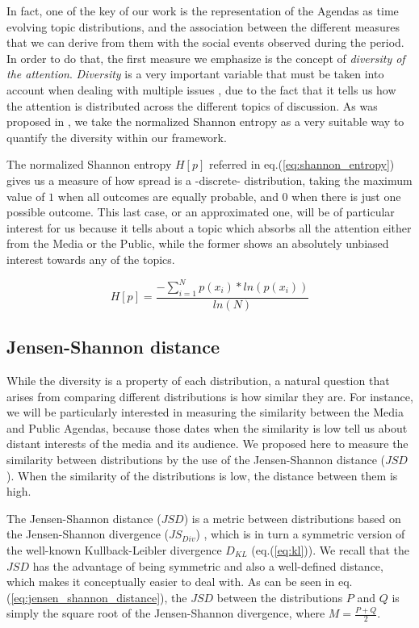 \documentclass{bmcart}
\begin{document}
\par In fact, one of the key of our work is the representation of the Agendas as time evolving topic distributions, and the association between the different measures that we can derive from them with the social events observed during the period.
In order to do that, the first measure we emphasize is the concept of \emph{diversity of the attention}.
\emph{Diversity} is a very important variable that must be taken into account when dealing with multiple issues \cite{boydstun2014importance}, due to the fact that it tells us how the attention is distributed across the different topics of discussion. 
As was proposed in \cite{boydstun2014importance}, we take the normalized Shannon entropy as a very suitable way to quantify the diversity within our framework.
\par The normalized Shannon entropy $H[p]$ referred in eq.(\ref{eq:shannon_entropy}) gives us a measure of how spread is a -discrete- distribution, taking the maximum value of $1$ when all outcomes are equally probable, and $0$ when there is just one possible outcome. 
This last case, or an approximated one, will be of particular interest for us because it tells about a topic which absorbs all the attention either from the Media or the Public, while the former shows an absolutely unbiased interest towards any of the topics.

\begin{equation}
H[p] = \frac{- \sum_{i = 1}^{N} p(x_i) * ln(p(x_i))}{ln(N)}
\label{eq:shannon_entropy}
\end{equation}

\subsection*{Jensen-Shannon distance}

\par While the diversity is a property of each distribution, a natural question that arises from comparing different distributions is how similar they are. For instance, we will be particularly interested in measuring the similarity between the Media and Public Agendas, because those dates when the similarity is low tell us about distant interests of the media and its audience.
We proposed here to measure the similarity between distributions by the use of the Jensen-Shannon distance ($JSD$). 
When the similarity of the distributions is low, the distance between them is high.
\par The Jensen-Shannon distance ($JSD$) is a metric between distributions based on the Jensen-Shannon divergence ($JS_{Div}$) \cite{fuglede2004jensen}, which is in turn a symmetric version of the well-known Kullback-Leibler divergence $D_{KL}$ (eq.(\ref{eq:kl})). 
We recall that the $JSD$ has the advantage of being symmetric and also a well-defined distance, which makes it conceptually easier to deal with.
As can be seen in eq.(\ref{eq:jensen_shannon_distance}), the $JSD$ between the distributions $P$ and $Q$ is simply the square root of the Jensen-Shannon divergence, where $M = \frac{P + Q}{2}$.
\end{document}
